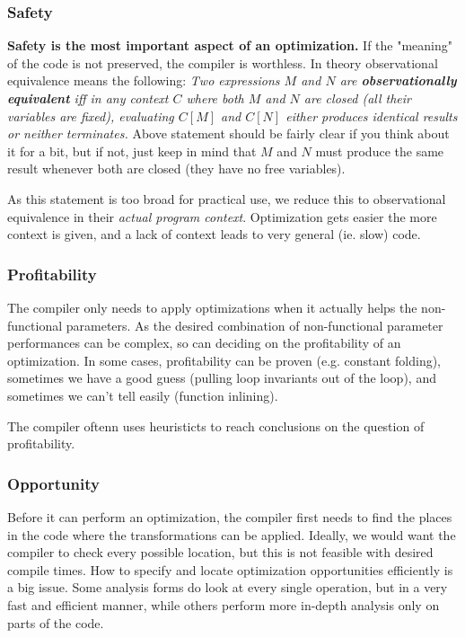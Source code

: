 \documentclass{article}
\begin{document}
\subsubsection{Safety}
\textbf{Safety is the most important aspect of an optimization.}
If the "meaning" of the code is not preserved, the compiler is worthless.
In theory observational equivalence means the following:
\emph{Two expressions $M$ and $N$ are \textbf{observationally equivalent} iff in any context $C$ where both $M$ and $N$ are closed (all their variables are fixed), evaluating $C\left[M\right]$ and $C\left[N\right]$ either produces identical results or neither terminates.}
Above statement should be fairly clear if you think about it for a bit, but if not, just keep in mind that $M$ and $N$ must produce the same result whenever both are closed (they have no free variables).

As this statement is too broad for practical use, we reduce this to observational equivalence in their \emph{actual program context}.
Optimization gets easier the more context is given, and a lack of context leads to very general (ie. slow) code.

\subsubsection{Profitability}
The compiler only needs to apply optimizations when it actually helps the non-functional parameters.
As the desired combination of non-functional parameter performances can be complex, so can deciding on the profitability of an optimization.
In some cases, profitability can be proven (e.g. constant folding), sometimes we have a good guess (pulling loop invariants out of the loop), and sometimes we can't tell easily (function inlining).

The compiler oftenn uses heuristicts to reach conclusions on the question of profitability.

\subsubsection{Opportunity}
Before it can perform an optimization, the compiler first needs to find the places in the code where the transformations can be applied.
Ideally, we would want the compiler to check every possible location, but this is not feasible with desired compile times.
How to specify and locate optimization opportunities efficiently is a big issue.
Some analysis forms do look at every single operation, but in a very fast and efficient manner, while others perform more in-depth analysis only on parts of the code.
\end{document}
